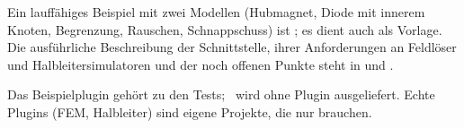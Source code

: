 Ein lauffähiges Beispiel mit zwei Modellen (Hubmagnet, Diode mit innerem
Knoten, Begrenzung, Rauschen, Schnappschuss) ist
; es dient auch als Vorlage. Die
ausführliche Beschreibung der Schnittstelle, ihrer Anforderungen an Feldlöser
und Halbleitersimulatoren und der noch offenen Punkte steht in
 und .

\begin{hinweis}
  Das Beispielplugin gehört zu den Tests; \esim\ wird ohne Plugin ausgeliefert.
  Echte Plugins (FEM, Halbleiter) sind eigene Projekte, die nur
   brauchen.
\end{hinweis}
